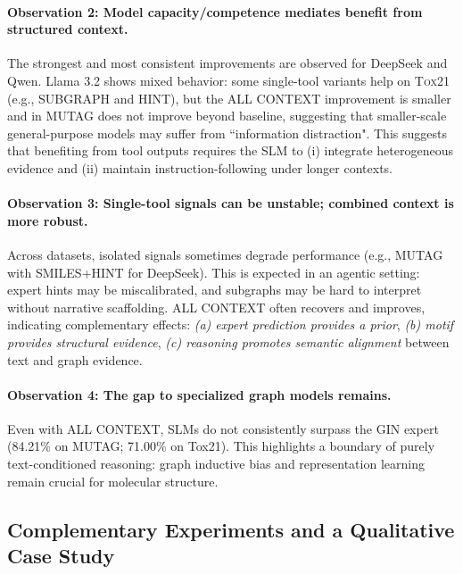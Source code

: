\documentclass[
]{ceurart}
\newcommand{\dataset}[1]{\textsc{#1}}
\newcommand{\gin}{\textsc{GIN}}
\begin{document}
\paragraph{Observation 2: Model capacity/competence mediates benefit from structured context.}
The strongest and most consistent improvements are observed for DeepSeek and Qwen.
Llama 3.2 shows mixed behavior: some single-tool variants help on \dataset{Tox21} (e.g., SUBGRAPH and HINT),
but the ALL CONTEXT improvement is smaller and in \dataset{MUTAG} does not improve beyond baseline, suggesting that smaller-scale general-purpose models may suffer from ``information distraction". 
This suggests that benefiting from tool outputs requires the SLM to (i) integrate heterogeneous evidence and (ii) maintain instruction-following under longer contexts.

\paragraph{Observation 3: Single-tool signals can be unstable; combined context is more robust.}
Across datasets, isolated signals sometimes degrade performance (e.g., MUTAG with SMILES+HINT for DeepSeek).
This is expected in an agentic setting: expert hints may be miscalibrated, and subgraphs may be hard to interpret without narrative scaffolding.
ALL CONTEXT often recovers and improves, indicating complementary effects:
\emph{(a) expert prediction provides a prior}, \emph{(b) motif provides structural evidence}, \emph{(c) reasoning promotes semantic alignment}
between text and graph evidence.

\paragraph{Observation 4: The gap to specialized graph models remains.}
Even with ALL CONTEXT, SLMs do not consistently surpass the \gin{} expert (84.21\% on MUTAG; 71.00\% on Tox21).
This highlights a boundary of purely text-conditioned reasoning: graph inductive bias and representation learning remain crucial for molecular structure.

\subsection{Complementary Experiments and a Qualitative Case Study}\label{sec:necessity}
\end{document}

